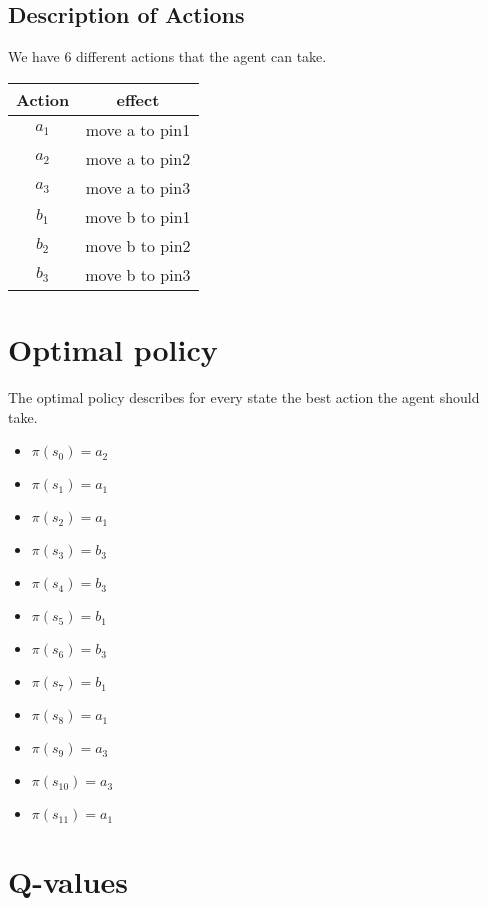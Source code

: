 \documentclass[a4paper]{article}
\begin{document}
\newpage
\subsection{Description of Actions}
We have 6 different actions that the agent can take. \\

\begin{tabular}{c|c}
Action & effect \\
\hline
$a_{1}$ & move a to pin1 \\
$a_{2}$ & move a to pin2 \\
$a_{3}$ & move a to pin3 \\
$b_{1}$ & move b to pin1 \\
$b_{2}$ & move b to pin2 \\
$b_{3}$ & move b to pin3
\end{tabular}


\section{Optimal policy}
The optimal policy describes for every state the best action the agent should take.

\begin{multicols}{2}
\begin{itemize}
\item $\pi(s_{0}) = a_{2}$
\item $\pi(s_{1}) = a_{1}$
\item $\pi(s_{2}) = a_{1}$
\item $\pi(s_{3}) = b_{3}$
\item $\pi(s_{4}) = b_{3}$
\item $\pi(s_{5}) = b_{1}$
\item $\pi(s_{6}) = b_{3}$
\item $\pi(s_{7}) = b_{1}$
\item $\pi(s_{8}) = a_{1}$
\item $\pi(s_{9}) = a_{3}$
\item $\pi(s_{10}) = a_{3}$
\item $\pi(s_{11}) = a_{1}$
\end{itemize}
\end{multicols}

\section{Q-values}
\end{document}
